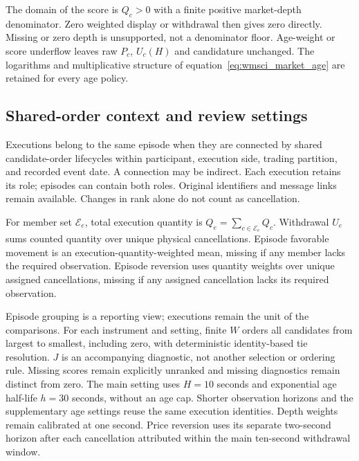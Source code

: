 The domain of the score is $Q_c>0$ with a finite positive market-depth denominator. Zero weighted display or withdrawal then gives zero directly. Missing or zero depth is unsupported, not a denominator floor. Age-weight or score underflow leaves raw $P_c$, $U_c(H)$ and candidature unchanged. The logarithms and multiplicative structure of equation~\eqref{eq:wmsci_market_age} are retained for every age policy.
\subsection{Shared-order context and review settings}
\label{subsec:event_reconstruction}
Executions belong to the same episode when they are connected by shared candidate-order lifecycles within participant, execution side, trading partition, and recorded event date. A connection may be indirect. Each execution retains its role; episodes can contain both roles. Original identifiers and message links remain available. Changes in rank alone do not count as cancellation.

For member set $\mathcal E_e$, total execution quantity is $Q_e=\sum_{c\in\mathcal E_e}Q_c$. Withdrawal $U_e$ sums counted quantity over unique physical cancellations. Episode favorable movement is an execution-quantity-weighted mean, missing if any member lacks the required observation. Episode reversion uses quantity weights over unique assigned cancellations, missing if any assigned cancellation lacks its required observation.

Episode grouping is a reporting view; executions remain the unit of the comparisons. For each instrument and setting, finite $W$ orders all candidates from largest to smallest, including zero, with deterministic identity-based tie resolution. $J$ is an accompanying diagnostic, not another selection or ordering rule. Missing scores remain explicitly unranked and missing diagnostics remain distinct from zero. The main setting uses $H=10$ seconds and exponential age half-life $h=30$ seconds, without an age cap. Shorter observation horizons and the supplementary age settings reuse the same execution identities. Depth weights remain calibrated at one second. Price reversion uses its separate two-second horizon after each cancellation attributed within the main ten-second withdrawal window.

